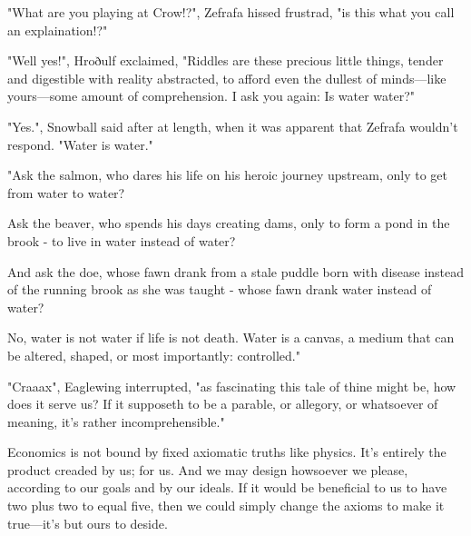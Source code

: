 "What are you playing at Crow!?", Zefrafa hissed frustrad, "is this what you call an explaination!?"

"Well yes!", Hroðulf exclaimed, "Riddles are these precious little things, tender and digestible with reality abstracted, to afford even the dullest of minds---like yours---some amount of comprehension. I ask you again: Is water water?"

"Yes.", Snowball said after at length, when it was apparent that Zefrafa wouldn't respond. "Water is water."

"Ask the salmon, who dares his life on his heroic journey upstream, only to get from water to water?

Ask the beaver, who spends his days creating dams, only to form a pond in the brook - to live in water instead of water?

And ask the doe, whose fawn drank from a stale puddle born with disease instead of the running brook as she was taught - whose fawn drank water instead of water?

No, water is not water if life is not death. Water is a canvas, a medium that can be altered, shaped, or most importantly: controlled."

"Craaax", Eaglewing interrupted, "as fascinating this tale of thine might be, how does it serve us? If it supposeth to be a parable, or allegory, or whatsoever of meaning, it's rather incomprehensible."



Economics is not bound by fixed axiomatic truths like physics. It's entirely the product creaded by us; for us. And we may design howsoever we please, according to our goals and by our ideals. If it would be beneficial to us to have two plus two to equal five, then we could simply change the axioms to make it true---it's but ours to deside.



